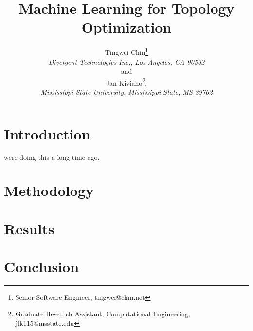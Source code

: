 \documentclass{article}
\title{
  Machine Learning for Topology Optimization
}
\author{
  Tingwei Chin\thanks{Senior Software Engineer, tingwei@chin.net} \\
  {\em Divergent Technologies Inc., Los Angeles, CA 90502} \\
  and \\
  Jan Kiviaho\thanks{Graduate Research Assistant, Computational Engineering, jfk115@msstate.edu}, \\
  {\em Mississippi State University, Mississippi State, MS 39762} \\
}
\date{}
\begin{document}
\maketitle

\section{Introduction}

\citet{adeli1995} were doing this a long time ago.

\section{Methodology}

\section{Results}

\section{Conclusion}



\end{document}
